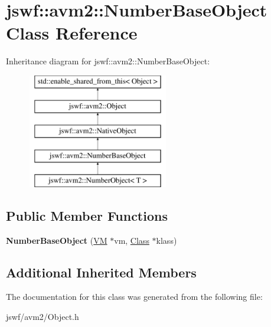 \hypertarget{classjswf_1_1avm2_1_1_number_base_object}{\section{jswf\+:\+:avm2\+:\+:Number\+Base\+Object Class Reference}
\label{classjswf_1_1avm2_1_1_number_base_object}
}
Inheritance diagram for jswf\+:\+:avm2\+:\+:Number\+Base\+Object\+:\begin{figure}[H]
\begin{center}
\leavevmode
\includegraphics[height=5.000000cm]{classjswf_1_1avm2_1_1_number_base_object}
\end{center}
\end{figure}
\subsection*{Public Member Functions}
\begin{DoxyCompactItemize}
\item 
\hypertarget{classjswf_1_1avm2_1_1_number_base_object_a092789e5e3e6662ea076b3209d4cad7b}{{\bfseries Number\+Base\+Object} (\hyperlink{classjswf_1_1avm2_1_1_v_m}{V\+M} $\ast$vm, \hyperlink{classjswf_1_1avm2_1_1_class}{Class} $\ast$klass)}\label{classjswf_1_1avm2_1_1_number_base_object_a092789e5e3e6662ea076b3209d4cad7b}

\end{DoxyCompactItemize}
\subsection*{Additional Inherited Members}


The documentation for this class was generated from the following file\+:\begin{DoxyCompactItemize}
\item 
jswf/avm2/Object.\+h\end{DoxyCompactItemize}
